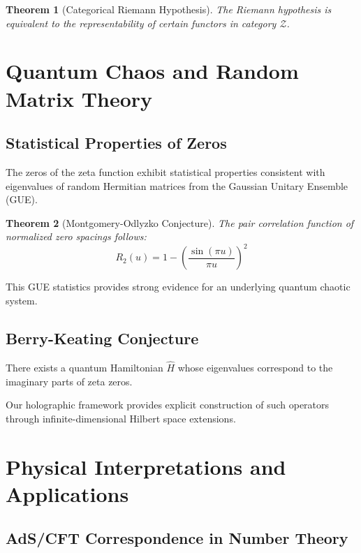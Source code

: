 \documentclass[12pt]{article}
\newtheorem{theorem}{Theorem}[section]
\begin{document}
\begin{theorem}[Categorical Riemann Hypothesis]
The Riemann hypothesis is equivalent to the representability of certain functors in category $\mathcal{Z}$.
\end{theorem}

\section{Quantum Chaos and Random Matrix Theory}

\subsection{Statistical Properties of Zeros}

The zeros of the zeta function exhibit statistical properties consistent with eigenvalues of random Hermitian matrices from the Gaussian Unitary Ensemble (GUE).

\begin{theorem}[Montgomery-Odlyzko Conjecture]
The pair correlation function of normalized zero spacings follows:
$$R_2(u) = 1 - \left(\frac{\sin(\pi u)}{\pi u}\right)^2$$
\end{theorem}

This GUE statistics provides strong evidence for an underlying quantum chaotic system.

\subsection{Berry-Keating Conjecture}

\begin{conjecture}
There exists a quantum Hamiltonian $\hat{H}$ whose eigenvalues correspond to the imaginary parts of zeta zeros.
\end{conjecture}

Our holographic framework provides explicit construction of such operators through infinite-dimensional Hilbert space extensions.

\section{Physical Interpretations and Applications}

\subsection{AdS/CFT Correspondence in Number Theory}
\end{document}
